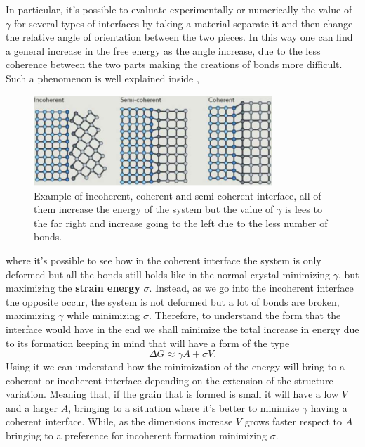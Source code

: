 In particular, it's possible to evaluate experimentally or numerically the value of $\gamma$ for several types of interfaces by taking a material separate it and then change the relative angle of orientation between the two pieces. In this way one can find a general increase in the free energy as the angle increase, due to the less coherence between the two parts making the creations of bonds more difficult. Such a phenomenon is well explained inside ,
\begin{figure}[t]
    \centering
    \includegraphics[width=0.8\textwidth]{Immagini/Coh-Incoh.png}
    \caption
    {
        Example of incoherent, coherent and semi-coherent interface, all of them increase the energy of the system but the value of $\gamma$ is lees to the far right and increase going to the left due to the less number of bonds.
    }
    \label{fig:Coh-Incoh}
\end{figure}
where it's possible to see how in the coherent interface the system is only deformed but all the bonds still holds like in the normal crystal minimizing $\gamma$, but maximizing the \textbf{strain energy} $\sigma$. Instead, as we go into the incoherent interface the opposite occur, the system is not deformed but a lot of bonds are broken, maximizing $\gamma$ while minimizing $\sigma$. Therefore, to understand the form that the interface would have in the end we shall minimize the total increase in energy due to its formation keeping in mind that will have a form of the type
\begin{equation}
    \Delta G \approx \gamma A + \sigma V.
\end{equation}
Using it we can understand how the minimization of the energy will bring to a coherent or incoherent interface depending on the extension of the structure variation. Meaning that, if the grain that is formed is small it will have a low $V$ and a larger $A$, bringing to a situation where it's better to minimize $\gamma$ having a coherent interface. While, as the dimensions increase $V$ grows faster respect to $A$ bringing to a preference for incoherent formation minimizing $\sigma$.

